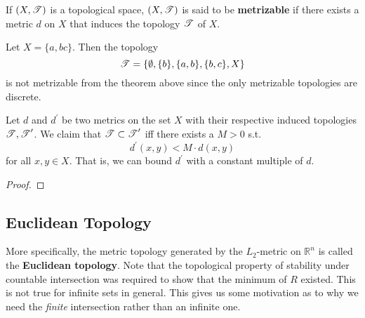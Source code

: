   \begin{definition}
    If $(X, \T)$ is a topological space, $(X, \T)$ is said to be \textbf{metrizable} if there exists a metric $d$ on $X$ that induces the topology $\T$ of $X$.
  \end{definition}

  \begin{example}
    Let $X = \{a, b c\}$. Then the topology 
    \begin{equation}
      \T = \{\emptyset, \{b\}, \{a, b\}, \{b, c\}, X \}
    \end{equation} 
    is not metrizable from the theorem above since the only metrizable topologies are discrete. 
  \end{example}

  \begin{lemma}
    Let $d$ and $d^\prime$ be two metrics on the set $X$ with their respective induced topologies $\T, \T^\prime$. We claim that $\T \subset \T^\prime$ iff there exists a $M > 0$ s.t. 
    \begin{equation}
      d^\prime (x, y) < M \cdot d(x, y)
    \end{equation} 
    for all $x, y \in X$. That is, we can bound $d^\prime$ with a constant multiple of $d$. 
  \end{lemma}
  \begin{proof}
    
  \end{proof}

\subsection{Euclidean Topology}

  More specifically, the metric topology generated by the $L_2$-metric on $\mathbb{R}^n$ is called the \textbf{Euclidean topology}. Note that the topological property of stability under countable intersection was required to show that the minimum of $R$ existed. This is not true for infinite sets in general. This gives us some motivation as to why we need the \textit{finite} intersection rather than an infinite one. 
  
